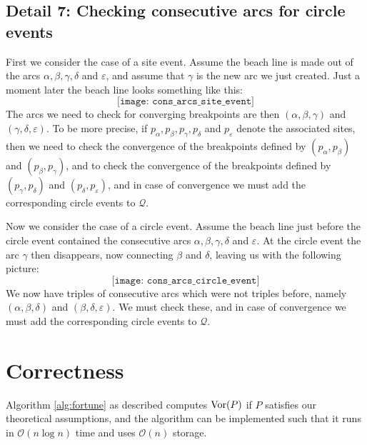\subsection*{Detail 7: Checking consecutive arcs for circle events}
First we consider the case of a site event. Assume the beach line is made out of the arcs $\alpha, \beta, \gamma, \delta$ and $\varepsilon$, and assume that $\gamma$ is the new arc we just created. Just a moment later the beach line looks something like this:
\[
    \texttt{[image: cons\_arcs\_site\_event]}
\]
The arcs we need to check for converging breakpoints are then $(\alpha, \beta, \gamma)$ and $(\gamma, \delta, \varepsilon)$. To be more precise, if $p_{\alpha}, p_{\beta}, p_{\gamma}, p_{\delta}$ and $p_{\varepsilon}$ denote the associated sites, then we need to check the convergence of the breakpoints defined by $(p_{\alpha}, p_{\beta})$ and $(p_{\beta}, p_{\gamma})$, and to check the convergence of the breakpoints defined by $(p_{\gamma}, p_{\delta})$ and $(p_{\delta}, p_{\varepsilon})$, and in case of convergence we must add the corresponding circle events to $\mathcal{Q}$.

Now we consider the case of a circle event. Assume the beach line just before the circle event contained the consecutive arcs $\alpha, \beta, \gamma, \delta$ and $\varepsilon$. At the circle event the arc $\gamma$ then disappears, now connecting $\beta$ and $\delta$, leaving us with the following picture:
\[
    \texttt{[image: cons\_arcs\_circle\_event]}
\]
We now have triples of consecutive arcs which were not triples before, namely $(\alpha, \beta, \delta)$ and $(\beta, \delta, \varepsilon)$. We must check these, and in case of convergence we must add the corresponding circle events to $\mathcal{Q}$.


\section{Correctness}
\begin{thm}
Algorithm \ref{alg:fortune} as described computes $\operatorname{Vor}(P)$ if $P$ satisfies our theoretical assumptions, and the algorithm can be implemented such that it runs in $\mathcal{O}(n \log n)$ time and uses $\mathcal{O}(n)$ storage.
\end{thm}